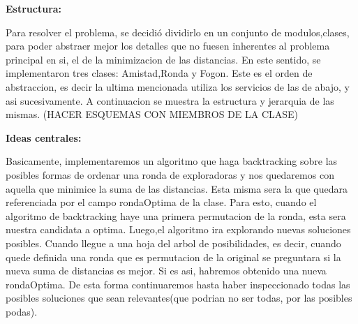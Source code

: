 \documentclass[10pt, a4paper]{article}
\begin{document}
\begin{flushleft}
\textbf{Estructura:}\\
\end{flushleft}

Para resolver el problema, se decidió dividirlo en un conjunto de modulos,clases, para poder abstraer mejor los detalles que no fuesen inherentes al problema principal en si, el de la minimizacion de las distancias.
En este sentido, se implementaron tres clases: Amistad,Ronda y Fogon. Este es el orden de abstraccion, es decir la ultima mencionada utiliza los servicios de las de abajo, y asi sucesivamente. A continuacion se muestra la estructura y jerarquia de las mismas. 
	(HACER ESQUEMAS CON MIEMBROS DE LA CLASE)

	
\begin{flushleft}
\textbf{Ideas centrales:}\\
\end{flushleft}

Basicamente, implementaremos un algoritmo que haga backtracking sobre las posibles formas de ordenar una ronda de exploradoras y nos quedaremos con aquella que minimice la suma de las distancias. Esta misma sera la que quedara referenciada por el campo rondaOptima de la clase.
Para esto, cuando el algoritmo de backtracking haye una primera permutacion de la ronda, esta sera nuestra candidata a optima. Luego,el algoritmo ira explorando nuevas soluciones posibles. Cuando llegue a una hoja del arbol de posibilidades, es decir, cuando quede definida una ronda que es permutacion de la original se preguntara si la nueva suma de distancias es mejor. Si es asi, habremos obtenido una nueva rondaOptima. De esta forma continuaremos hasta haber inspeccionado todas las posibles soluciones que sean relevantes(que podrian no ser todas, por las posibles podas).
\end{document}
